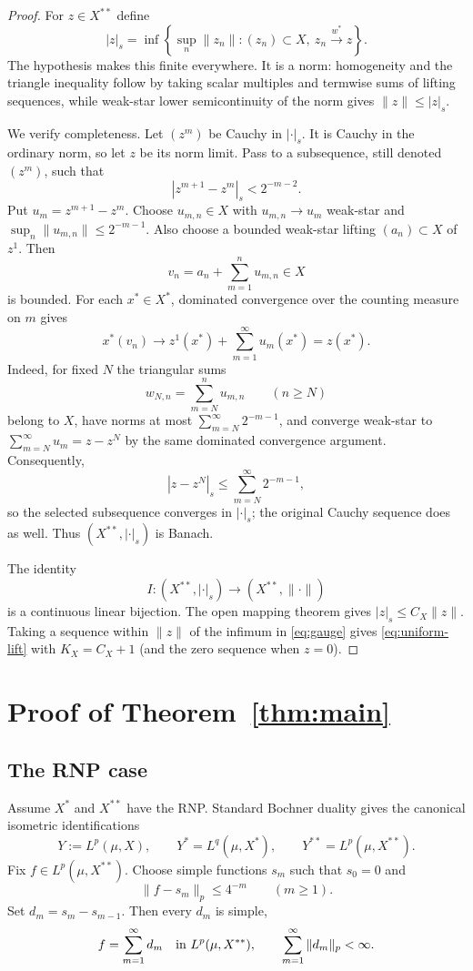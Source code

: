 \documentclass[11pt]{article}
\newcommand{\wstar}{w^*}
\begin{document}
\begin{proof}
For $z\in X^{**}$ define
\begin{equation}\label{eq:gauge}
 |z|_s=\inf\left\{\sup_n\|z_n\|:
       (z_n)\subset X,\ z_n\xrightarrow{\wstar}z\right\}.
\end{equation}
The hypothesis makes this finite everywhere.  It is a norm: homogeneity and
the triangle inequality follow by taking scalar multiples and termwise sums
of lifting sequences, while weak-star lower semicontinuity of the norm gives
$\|z\|\leq|z|_s$.

We verify completeness.  Let $(z^m)$ be Cauchy in $|\cdot|_s$.  It is Cauchy
in the ordinary norm, so let $z$ be its norm limit.  Pass to a subsequence,
still denoted $(z^m)$, such that
\[
 |z^{m+1}-z^m|_s<2^{-m-2}.
\]
Put $u_m=z^{m+1}-z^m$.  Choose $u_{m,n}\in X$ with
$u_{m,n}\to u_m$ weak-star and
$\sup_n\|u_{m,n}\|\leq2^{-m-1}$.  Also choose a bounded weak-star lifting
$(a_n)\subset X$ of $z^1$.  Then
\[
 v_n=a_n+\sum_{m=1}^n u_{m,n}\in X
\]
is bounded.  For each $x^*\in X^*$, dominated convergence over the counting
measure on $m$ gives
\[
 x^*(v_n)\longrightarrow
 z^1(x^*)+\sum_{m=1}^\infty u_m(x^*)=z(x^*).
\]
Indeed, for fixed $N$ the triangular sums
\[
 w_{N,n}=\sum_{m=N}^{n}u_{m,n}\qquad(n\geq N)
\]
belong to $X$, have norms at most $\sum_{m=N}^\infty2^{-m-1}$, and
converge weak-star to $\sum_{m=N}^\infty u_m=z-z^N$ by the same dominated
convergence argument.  Consequently,
\[
 |z-z^N|_s\leq\sum_{m=N}^\infty 2^{-m-1},
\]
so the selected subsequence converges in $|\cdot|_s$; the original Cauchy
sequence does as well.  Thus $(X^{**},|\cdot|_s)$ is Banach.

The identity
\[
 I:(X^{**},|\cdot|_s)\longrightarrow(X^{**},\|\cdot\|)
\]
is a continuous linear bijection.  The open mapping theorem gives
$|z|_s\leq C_X\|z\|$.  Taking a sequence within $\|z\|$ of the infimum in
\eqref{eq:gauge} gives \eqref{eq:uniform-lift} with $K_X=C_X+1$ (and the zero
sequence when $z=0$).
\end{proof}

\section{Proof of Theorem~\ref{thm:main}}

\subsection*{The RNP case}

Assume $X^*$ and $X^{**}$ have the RNP.  Standard Bochner duality
\cite[Chapter IV]{DiestelUhl} gives the canonical isometric identifications
\begin{equation}\label{eq:rnp-id}
 Y:=L^p(\mu,X),\qquad
 Y^*=L^q(\mu,X^*),\qquad
 Y^{**}=L^p(\mu,X^{**}).
\end{equation}
Fix $f\in L^p(\mu,X^{**})$.  Choose simple functions $s_m$ such that
$s_0=0$ and
\[
 \|f-s_m\|_p\leq4^{-m}\qquad(m\geq1).
\]
Set $d_m=s_m-s_{m-1}$.  Then every $d_m$ is simple,
\begin{equation}\label{eq:series}
 f=\sum_{m=1}^\infty d_m\quad\hbox{in }L^p(\mu,X^{**}),
 \qquad
 \sum_{m=1}^\infty\|d_m\|_p<\infty.
\end{equation}
\end{document}
